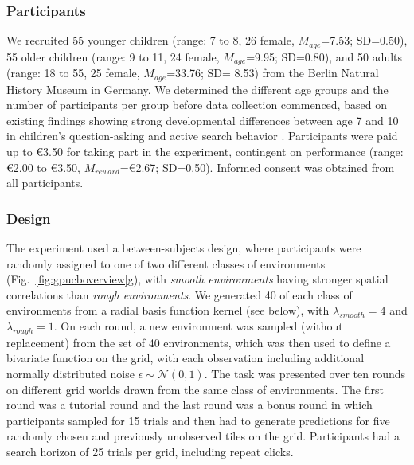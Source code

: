 \documentclass[a4paper,man, floatsintext, natbib]{apa6}
\begin{document}
\subsubsection*{Participants} 
We recruited 55 younger children (range: 7 to 8, 26 female, $M_{age}$=7.53; SD=0.50), 55 older children (range: 9 to 11, 24 female, $M_{age}$=9.95; SD=0.80), and 50 adults (range: 18 to 55, 25 female, $M_{age}$=33.76; SD= 8.53) from the Berlin Natural History Museum in Germany. We determined the different age groups and the number of participants per group before data collection commenced, based on existing findings showing strong developmental differences between age 7 and 10 in children's question-asking and active search behavior \citep{Ruggeri2015,davidson1991developmental}. Participants were paid up to \euro{}3.50 for taking part in the experiment, contingent on performance (range: \euro{}2.00 to \euro{}3.50, $M_{reward}$=\euro{}2.67; SD=0.50). Informed consent was obtained from all participants. 


\subsubsection*{Design} The experiment used a between-subjects design, where participants were randomly assigned to one of two different classes of environments (Fig.~\ref{fig:gpucboverview}g), with \emph{smooth environments} having stronger spatial correlations than \emph{rough environments}. We generated 40 of each class of environments from a radial basis function kernel (see below), with $\lambda_{smooth}=4$ and $\lambda_{rough}=1$. On each round, a new environment was sampled (without replacement) from the set of 40 environments, which was then used to define a bivariate function on the grid, with each observation including additional normally distributed noise $\epsilon \sim \mathcal{N}\left(0,1 \right)$. The task was presented over ten rounds on different grid worlds drawn from the same class of environments. The first round was a tutorial round and the last round was a bonus round in which participants sampled for 15 trials and then had to generate predictions for five randomly chosen and previously unobserved tiles on the grid. Participants had a search horizon of 25 trials per grid, including repeat clicks.
\end{document}
